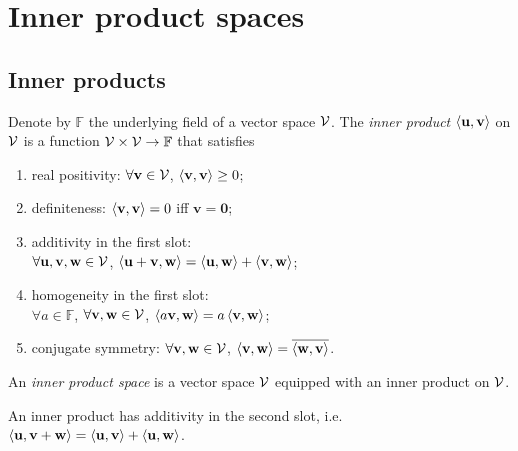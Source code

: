 \section{Inner product spaces}
\label{sec:inner-product-spaces}

\subsection{Inner products}
\label{sec:inner-products-norms}

\begin{defn}
  \label{def:innerProduct}
  Denote by $\mathbb{F}$ the underlying field of
  a vector space ${\cal V}$.
  The \emph{inner product} $\left\langle \mathbf{u},\mathbf{v} \right\rangle$ on ${\cal V}$
  is a function ${\cal V}\times{\cal V}\rightarrow \mathbb{F}$
  that satisfies
  \begin{enumerate}[({IP}-1)]
    \itemsep0em
  \item real positivity: 
    $\forall \mathbf{v}\in{\cal V}$,
    $\left\langle \mathbf{v},\mathbf{v} \right\rangle\ge 0$;
  \item definiteness:
    $\left\langle \mathbf{v},\mathbf{v} \right\rangle= 0$
    iff $\mathbf{v}=\mathbf{0}$;
  \item additivity in the first slot:\\
    $\forall \mathbf{u},\mathbf{v},\mathbf{w}\in{\cal V}$,
    $\left\langle \mathbf{u}+\mathbf{v},\mathbf{w} \right\rangle
    = \left\langle \mathbf{u},\mathbf{w} \right\rangle
    + \left\langle \mathbf{v},\mathbf{w} \right\rangle$;
  \item homogeneity in the first slot:\\
    $\forall a\in \mathbb{F}$,
    $\forall \mathbf{v},\mathbf{w}\in{\cal V}$,
    $\left\langle a\mathbf{v},\mathbf{w} \right\rangle
    = a\left\langle \mathbf{v},\mathbf{w} \right\rangle$;
  \item conjugate symmetry:
    $\forall \mathbf{v},\mathbf{w}\in{\cal V}$,
    $\left\langle \mathbf{v},\mathbf{w} \right\rangle
    = \overline{\left\langle \mathbf{w},\mathbf{v} \right\rangle}$.
  \end{enumerate}
  An \emph{inner product space} is a vector space ${\cal V}$
  equipped with an inner product on ${\cal V}$.
\end{defn}

\begin{coro}
  \label{coro:additivity2ndSlot}
  An inner product has additivity
  in the second slot, i.e.
  $\left\langle \mathbf{u}, \mathbf{v}+\mathbf{w} \right\rangle
  = \left\langle \mathbf{u}, \mathbf{v} \right\rangle
  + \left\langle \mathbf{u}, \mathbf{w} \right\rangle$.
\end{coro}


